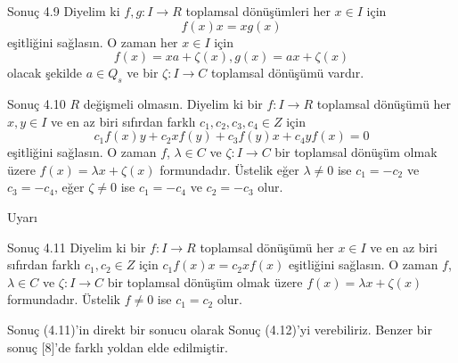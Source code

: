 \documentclass{beamer}
\begin{document}
\begin{frame}

\begin{block}{Sonuç 4.9}
Diyelim ki $f, g \colon I \to R$ toplamsal dönüşümleri her $x \in I$ için
\begin{equation*}
    f(x)x = xg(x)
\end{equation*}
eşitliğini sağlasın. O zaman her $x \in I$ için
\begin{equation*}
    f(x) = xa + \zeta(x), g(x) = ax + \zeta(x)
\end{equation*}
olacak şekilde $a \in Q_s$ ve bir $\zeta \colon I \to C$ toplamsal dönüşümü vardır.
\end{block}
    
\end{frame}

\begin{frame}

\begin{block}{Sonuç 4.10}
$R$ değişmeli olmasın. Diyelim ki bir $f \colon I \to R$ toplamsal dönüşümü her $x, y \in I$ ve en az biri sıfırdan farklı $c_1, c_2, c_3, c_4 \in Z$ için
\begin{equation*}
    c_1f(x)y + c_2xf(y) + c_3f(y)x + c_4yf(x) = 0
\end{equation*}
eşitliğini sağlasın. O zaman $f$, $\lambda \in C$ ve $\zeta \colon I \to C$ bir toplamsal dönüşüm olmak üzere $f(x) = \lambda x + \zeta(x)$ formundadır. Üstelik eğer $\lambda \neq 0$ ise $c_1 = - c_2$ ve $c_3 = - c_4$, eğer $\zeta \neq 0$ ise $c_1 = - c_4$ ve $c_2 = - c_3$ olur.
\end{block}
    
\end{frame}

\begin{frame}

\begin{block}{Uyarı}

\end{block}
    
\end{frame}

\begin{frame}

\begin{block}{Sonuç 4.11}
Diyelim ki bir $f \colon I \to R$ toplamsal dönüşümü her $x \in I$ ve en az biri sıfırdan farklı $c_1, c_2 \in Z$ için $c_1f(x)x = c_2xf(x)$ eşitliğini sağlasın. O zaman $f$, $\lambda \in C$ ve $\zeta \colon I \to C$ bir toplamsal dönüşüm olmak üzere $f(x) = \lambda x + \zeta(x)$ formundadır. Üstelik $f \neq 0$ ise $c_1 = c_2$ olur.
\end{block}

Sonuç (4.11)'in direkt bir sonucu olarak Sonuç (4.12)'yi verebiliriz. Benzer bir sonuç [8]'de farklı yoldan elde edilmiştir.
    
\end{frame}
\end{document}
